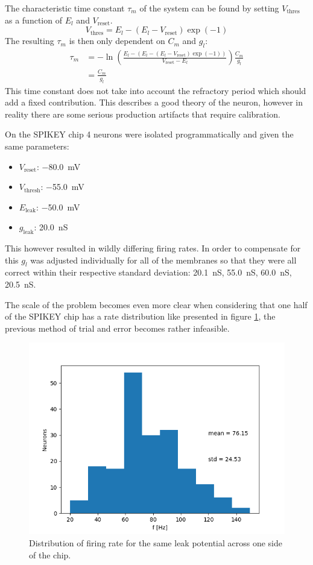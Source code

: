 \documentclass[a4paper,twocolumn]{article}
\begin{document}
The characteristic time constant $\tau_m$ of the system can be found by setting
$V_\text{thres}$ as a function of $E_l$ and $V_\text{reset}$.
\[
    V_\text{thres} = E_l - (E_l - V_\text{reset})\exp(-1)
\]
The resulting $\tau_m$ is then only dependent on $C_m$ and $g_l$:
\begin{align*}
    \tau_m &= -\ln(\frac{E_l - (E_l - (E_l - V_\text{reset})\exp(-1))}{V_\text{reset} - E_l}) \frac{C_m}{g_l}\\
           &= \frac{C_m}{g_l}
\end{align*}
This time constant does not take into account the refractory period which should
add a fixed contribution. This describes a good theory of the neuron, however
in reality there are some serious production artifacts that require calibration.

On the SPIKEY chip 4 neurons were isolated programmatically and given the same
parameters:
\begin{itemize}
    \item $V_\text{reset}$: \SI{-80.0}{\milli\volt}
    \item $V_\text{thresh}$: \SI{-55.0}{\milli\volt}
    \item $E_\text{leak}$: \SI{-50.0}{\milli\volt}
    \item $g_\text{leak}$:  \SI{20.0}{\nano\siemens}
\end{itemize}

This however resulted in wildly differing firing rates. In order to compensate
for this $g_l$ was adjusted individually for all of the membranes so that they
were all correct within their respective standard deviation:
\SI{20.1}{\nano\siemens}, \SI{55.0}{\nano\siemens}, \SI{60.0}{\nano\siemens},
\SI{20.5}{\nano\siemens}.

The scale of the problem becomes even more clear when considering that one
half of the SPIKEY chip has a rate distribution like presented in figure
\ref{fig:distribution}, the previous method of trial and error becomes rather
infeasible.

\begin{figure}[ht]
    \centering
    \includegraphics[width=.5\textwidth]{figures/rate-distribution.png}
    \caption{Distribution of firing rate for the same leak potential across one
    side of the chip.}
    \label{fig:distribution}
\end{figure}
\end{document}
